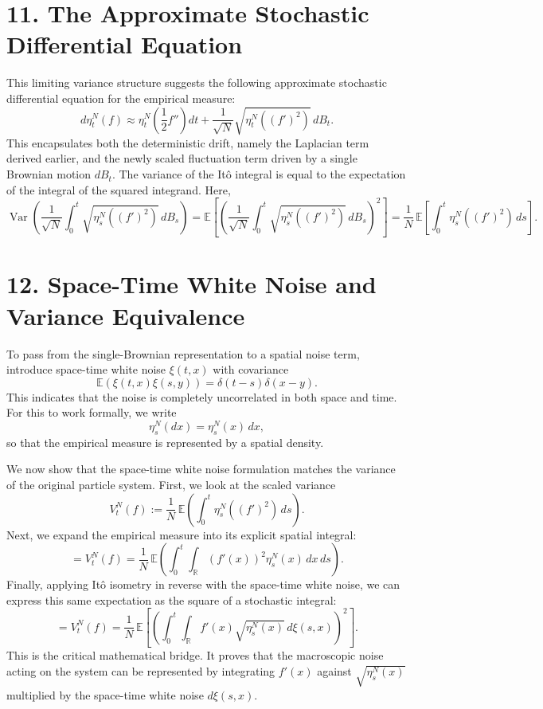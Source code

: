 \documentclass[11pt]{article}
\theoremstyle{definition}
\theoremstyle{remark}
\begin{document}
\section*{11. The Approximate Stochastic Differential Equation}
This limiting variance structure suggests the following approximate stochastic differential equation for the empirical measure:
\[
d\eta_t^N(f)\approx \eta_t^N\!\left(\frac{1}{2}f''\right)dt+\frac{1}{\sqrt{N}}\sqrt{\eta_t^N((f')^2)}\,dB_t.
\]
This encapsulates both the deterministic drift, namely the Laplacian term derived earlier, and the newly scaled fluctuation term driven by a single Brownian motion $dB_t$. The variance of the It\^o integral is equal to the expectation of the integral of the squared integrand. Here,
\[
\operatorname{Var}\!\left(\frac{1}{\sqrt{N}}\int_0^t \sqrt{\eta_s^N((f')^2)}\,dB_s\right)
=
\mathbb E\!\left[\left(\frac{1}{\sqrt{N}}\int_0^t \sqrt{\eta_s^N((f')^2)}\,dB_s\right)^2\right]
=
\frac{1}{N}\,\mathbb E\!\left[\int_0^t \eta_s^N((f')^2)\,ds\right].
\]

\section*{12. Space-Time White Noise and Variance Equivalence}
To pass from the single-Brownian representation to a spatial noise term, introduce space-time white noise $\xi(t,x)$ with covariance
\[
\mathbb E(\xi(t,x)\xi(s,y))=\delta(t-s)\delta(x-y).
\]
This indicates that the noise is completely uncorrelated in both space and time. For this to work formally, we write
\[
\eta_s^N(dx)=\eta_s^N(x)\,dx,
\]
so that the empirical measure is represented by a spatial density.

We now show that the space-time white noise formulation matches the variance of the original particle system. First, we look at the scaled variance
\[
V_t^N(f)
:=
\frac{1}{N}\,\mathbb E\!\left(\int_0^t \eta_s^N((f')^2)\,ds\right).
\]
Next, we expand the empirical measure into its explicit spatial integral:
\[
=
V_t^N(f)
=
\frac{1}{N}\,\mathbb E\!\left(\int_0^t \int_{\mathbb R} (f'(x))^2\eta_s^N(x)\,dx\,ds\right).
\]
Finally, applying It\^o isometry in reverse with the space-time white noise, we can express this same expectation as the square of a stochastic integral:
\[
=
V_t^N(f)
=
\frac{1}{N}\,\mathbb E\!\left[\left(\int_0^t \int_{\mathbb R} f'(x)\sqrt{\eta_s^N(x)}\,d\xi(s,x)\right)^2\right].
\]
This is the critical mathematical bridge. It proves that the macroscopic noise acting on the system can be represented by integrating $f'(x)$ against $\sqrt{\eta_s^N(x)}$ multiplied by the space-time white noise $d\xi(s,x)$.
\end{document}
